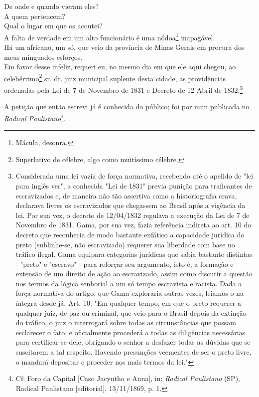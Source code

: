 De onde e quando vieram eles?\\
A quem pertencem?\\
Qual o lugar em que os acoutei?\\
A falta de verdade em um alto funcionário é uma nódoa\footnote{Mácula,
  desonra.} inapagável.\\
Há um africano, um só, que veio da província de Minas Gerais em procura
dos meus minguados esforços.\\
Em favor desse infeliz, requeri eu, no mesmo dia em que ele aqui chegou,
ao celebérrimo\footnote{Superlativo de célebre, algo como muitíssimo
  célebre.} sr. dr. juiz municipal suplente desta cidade, as
providências ordenadas pela Lei de 7 de Novembro de 1831 e Decreto de 12
Abril de 1832.\footnote{Considerada uma lei vazia de força normativa,
  recebendo até o apelido de "lei para inglês ver", a conhecida "Lei de
  1831" previa punição para traficantes de escravizados e, de maneira
  não tão assertiva como a historiografia crava, declarava livres os
  escravizados que chegassem ao Brasil após a vigência da lei. Por sua
  vez, o decreto de 12/04/1832 regulava a execução da Lei de 7 de
  Novembro de 1831. Gama, por sua vez, fazia referência indireta ao art.
  10 do decreto que reconhecia de modo bastante enfático a capacidade
  jurídica do preto (sublinhe-se, não escravizado) requerer sua
  liberdade com base no tráfico ilegal. Gama equipara categorias
  jurídicas que sabia bastante distintas - "preto" e "escravo" - para
  reforçar seu argumento, isto é, a formação e extensão de um direito de
  ação ao escravizado, assim como discutir a questão nos termos da
  lógica senhorial a um só tempo escravista e racista. Dada a força
  normativa do artigo, que Gama exploraria outras vezes, leiamos-o na
  íntegra desde já. Art. 10. "Em qualquer tempo, em que o preto requerer
  a qualquer juiz, de paz ou criminal, que veio para o Brasil depois da
  extinção do tráfico, o juiz o interrogará sobre todas as
  circunstâncias que possam esclarecer o fato, e oficialmente procederá
  a todas as diligências necessárias para certificar-se dele, obrigando
  o senhor a desfazer todas as dúvidas que se suscitarem a tal respeito.
  Havendo presunções veementes de ser o preto livre, o mandará depositar
  e proceder nos mais termos da lei."}

A petição que então escrevi já é conhecida do público; foi por mim
publicada no \emph{Radical Paulistano}\footnote{Cf: Foro da Capital
  {[}Caso Jacyntho e Anna{]}, in: \emph{Radical Paulistano} (SP),
  Radical Paulistano {[}editorial{]}, 13/11/1869, p. 1.}.

